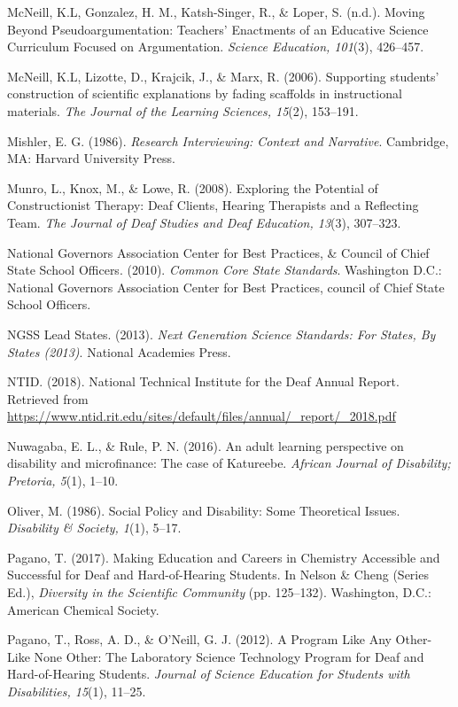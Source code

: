 \documentclass[11.5pt]{sig-alternate} %
\begin{document}
\begin{hangparas}{0.25in}{1}
McNeill, K.L, Gonzalez, H. M., Katsh-Singer, R., \& Loper, S. (n.d.). Moving Beyond Pseudoargumentation: Teachers’ Enactments of an Educative Science Curriculum Focused on Argumentation. \textit{Science Education, 101}(3), 426–457.

McNeill, K.L, Lizotte, D., Krajcik, J., \& Marx, R. (2006). Supporting students’ construction of scientific explanations by fading scaffolds in instructional materials. \textit{The Journal of the Learning Sciences, 15}(2), 153–191.

Mishler, E. G. (1986). \textit{Research Interviewing: Context and Narrative}. Cambridge, MA: Harvard University Press.

Munro, L., Knox, M., \& Lowe, R. (2008). Exploring the Potential of Constructionist Therapy: Deaf Clients, Hearing Therapists and a Reflecting Team. \textit{The Journal of Deaf Studies and Deaf Education, 13}(3), 307–323. 

National Governors Association Center for Best Practices, \& Council of Chief State School Officers. (2010). \textit{Common Core State Standards}. Washington D.C.: National Governors Association Center for Best Practices, council of Chief State School Officers.

NGSS Lead States. (2013). \textit{Next Generation Science Standards: For States, By States (2013)}. National Academies Press.

NTID. (2018). National Technical Institute for the Deaf Annual Report. Retrieved from \url{https://www.ntid.rit.edu/sites/default/files/annual/_report/_2018.pdf}

Nuwagaba, E. L., \& Rule, P. N. (2016). An adult learning perspective on disability and microfinance: The case of Katureebe. \textit{African Journal of Disability; Pretoria, 5}(1), 1–10. 

Oliver, M. (1986). Social Policy and Disability: Some Theoretical Issues. \textit{Disability \& Society, 1}(1), 5–17.

Pagano, T. (2017). Making Education and Careers in Chemistry Accessible and Successful for Deaf and Hard-of-Hearing Students. In Nelson \& Cheng (Series Ed.), \textit{Diversity in the Scientific Community} (pp. 125–132). Washington, D.C.: American Chemical Society.

Pagano, T., Ross, A. D., \& O’Neill, G. J. (2012). A Program Like Any Other-Like None Other: The Laboratory Science Technology Program for Deaf and Hard-of-Hearing Students. \textit{Journal of Science Education for Students with Disabilities, 15}(1), 11–25.


\end{hangparas}
\end{document}
